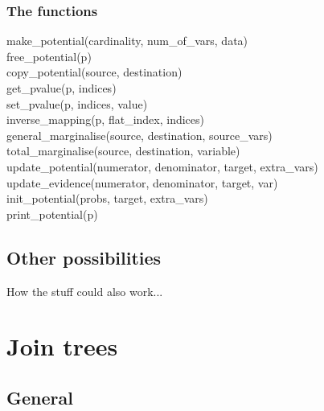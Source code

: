 \documentclass[12pt,a4paper]{report}
\begin{document}
\subsubsection{The functions}

\begin{description}
\item[make_potential(cardinality, num_of_vars, data)]

\item[free_potential(p)]

\item[copy_potential(source, destination)]

\item[get_pvalue(p, indices)]

\item[set_pvalue(p, indices, value)]

\item[inverse_mapping(p, flat_index, indices)]

\item[general_marginalise(source, destination, source_vars)]

\item[total_marginalise(source, destination, variable)]

\item[update_potential(numerator, denominator, target, extra_vars)]

\item[update_evidence(numerator, denominator, target, var)]

\item[init_potential(probs, target, extra_vars)]

\item[print_potential(p)]

\end{description}


\subsection{Other possibilities}

How the stuff could also work...


\newpage
\section{Join trees} %
\subsection{General}
\end{document}
